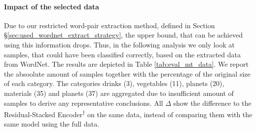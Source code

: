 \paragraph*{Impact of the selected data}
Due to our restricted word-pair extraction method, defined in Section §\ref{sec:used_wordnet_extract_strategy}, the upper bound, that can be achieved using this information drops. Thus, in the following analysis we only look at samples, that could have been classified correctly, based on the extracted data from WordNet. The results are depicted in Table \ref{tab:eval_mt_data}. We report the absoolute amount of samples together with the percentage of the original size of each category. The categories drinks (3), vegetables (11), planets (20), materials (35) and planets (37) are aggregated due to insufficient amount of samples to derive any representative conclusions. All $\Delta$ show the difference to the Residual-Stacked Encoder\textsuperscript{$\dagger$} on the same data, instead of comparing them with the same model using the full data.

